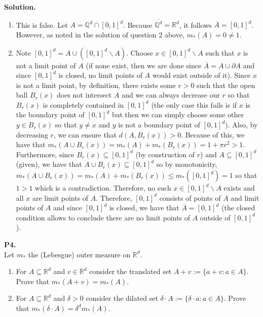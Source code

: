 \documentclass{article}
\begin{document}
    \textbf{Solution.}
    \begin{enumerate}
        \item This is false. Let $A = \mathbb{Q}^d\cap [0,1]^d$. Because $\overline{\mathbb{Q}^d} = \mathbb{R}^d$, it follows
            $\overline{A} = [0,1]^d$. However, as noted in the solution of question 2 above, $m_*(A) = 0 \neq 1$.
        \item Note $[0,1]^d = A\cup([0,1]^d\backslash A)$. Choose $x\in [0,1]^d\backslash A$ such that $x$ is not a limit point
            of $A$ (if none exist, then we are done since $\overline{A} = A \cup \partial{A}$ and since $[0,1]^d$ is closed,
            no limit points of $A$ would exist outside of it). Since $x$ is not a limit point, by definition, there exists some
            $r>0$ such that the open ball $B_r(x)$ does not intersect $A$ and we can always decrease our $r$ so that $B_r(x)$
            is completely contained in $[0,1]^d$ (the only case this fails is if $x$ is the boundary point of $[0,1]^d$ but then
            we can simply choose some other $y\in B_r(x)$ so that $y\neq x$ and $y$ is not a boundary point of $[0,1]^d$). Also,
            by decreasing $r$, we can ensure that $d(A,B_r(x)) > 0$. Because of this, we have that $m_*(A\cup B_r(x))
            = m_*(A) + m_*(B_r(x)) = 1 + \pi r^2 > 1$. Furthermore, since $B_r(x)\subseteq [0,1]^d$ (by construction of $r$)
            and $A\subseteq [0,1]^d$ (given), we have that $A\cup B_r(x)\subseteq [0,1]^d$ so by monotonicity,
            $m_*(A\cup B_r(x)) = m_*(A) + m_*(B_r(x)) \leq m_*([0,1]^d) = 1$ so that $1 > 1$ which is a contradiction. Therefore,
            no such $x\in [0,1]^d\backslash A$ exists and all $x$ are limit points of $A$. Therefore, $[0,1]^d$ consists of points
            of $A$ and limit points of $A$ and since $[0,1]^d$ is closed, we have that $\overline{A} = [0,1]^d$ (the closed
            condition allows to conclude there are no limit points of $A$ outside of $[0,1]^d$).
    \end{enumerate}

    \textbf{P4.} \\

    Let $m_*$ the (Lebesgue) outer measure on $\mathbb{R}^d$.
    \begin{enumerate}
        \item For $A\subseteq\mathbb{R}^d$ and $v\in\mathbb{R}^d$ consider the translated set $A + v := \{a+v: a\in A\}$.
            Prove that $m_*(A+v) = m_*(A)$.
        \item For $A\subseteq\mathbb{R}^d$ and $\delta > 0$ consider the dilated set $\delta\cdot A := \{\delta\cdot a: a\in A\}$.
            Prove that $m_*(\delta\cdot A) = \delta^dm_*(A)$.
    \end{enumerate}
\end{document}

